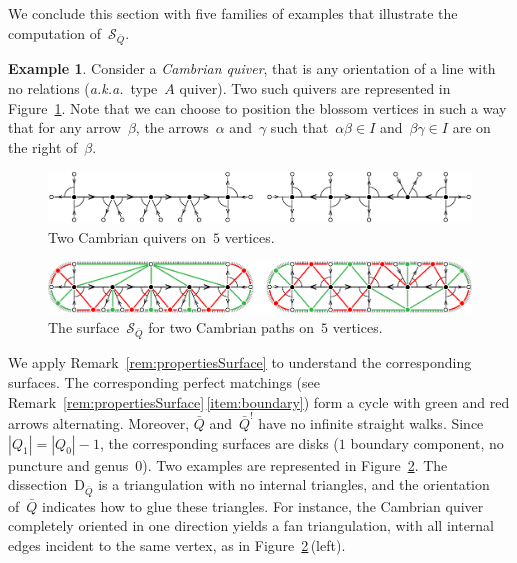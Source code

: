 \documentclass{amsart}
\theoremstyle{definition}
\newtheorem{example}[theorem]{Example}
\newcommand{\fref}[1]{Figure~\ref{#1}} %
\newcommand{\aka}{\textit{a.k.a.}~} %
\newcommand{\darkblue}{\color{darkblue}} %
\newcommand{\defn}[1]{\textsl{\darkblue #1}} %
\newcommand{\surface}{\mathcal{S}} %
\newcommand{\dissection}{\mathrm{D}} %
\newcommand{\koszul}{^!} %
\begin{document}
\enlargethispage{.4cm}
We conclude this section with five families of examples that illustrate the computation of~$\surface_{\bar Q}$.

\begin{example}
\label{exm:CambrianPath}
Consider a \defn{Cambrian quiver}, that is any orientation of a line with no relations (\aka type~$A$ quiver).
Two such quivers are represented in \fref{fig:CambrianPathsQuivers}.
Note that we can choose to position the blossom vertices in such a way that for any arrow~$\beta$, the arrows~$\alpha$ and~$\gamma$ such that~$\alpha\beta \in I$ and~$\beta\gamma \in I$ are on the right of~$\beta$.

\begin{figure}[h]
	\capstart
	\centerline{\includegraphics[scale=.45]{CambrianPathsQuivers}}
	\caption{Two Cambrian quivers on~$5$ vertices.}
	\label{fig:CambrianPathsQuivers}
\end{figure}

\begin{figure}[h]
	\capstart
	\centerline{\includegraphics[scale=.7]{CambrianPathsSurfaces}}
	\caption{The surface~$\surface_{\bar Q}$ for two Cambrian paths on~$5$ vertices.}
	\label{fig:CambrianPathsSurfaces}
\end{figure}

We apply Remark~\ref{rem:propertiesSurface} to understand the corresponding surfaces.
The corresponding perfect matchings (see Remark~\ref{rem:propertiesSurface}\,\eqref{item:boundary}) form a cycle with green and red arrows alternating.
Moreover, $\bar Q$ and~$\bar Q\koszul$ have no infinite straight walks.
Since~$|Q_1| = |Q_0|-1$, the corresponding surfaces are disks ($1$ boundary component, no puncture and genus~$0$).
Two examples are represented in \fref{fig:CambrianPathsSurfaces}.
The dissection~$\dissection_{\bar Q}$ is a triangulation with no internal triangles, and the orientation of~$\bar Q$ indicates how to glue these triangles.
For instance, the Cambrian quiver completely oriented in one direction yields a fan triangulation, with all internal edges incident to the same vertex, as in \fref{fig:CambrianPathsSurfaces}\,(left).
\end{example}
\end{document}
